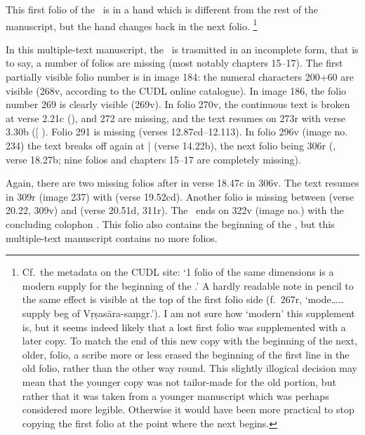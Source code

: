 This first folio of the \VSS\ is in a hand which is different from the
rest of the manuscript, but the hand changes back in the next folio.%
	\footnote{Cf.~the metadata on the CUDL site: 
	`1 folio of the same dimensions is a modern supply for the 
	beginning of the .' A hardly readable 
	note in pencil to the same effect is visible at the
    top of the first folio side (f.~267r, `mode\ldots{}\ldots{} supply beg
    of Vṛṣasāra-saṃgr.'). I am not sure how `modern' this supplement is,
   but it seems indeed likely that a lost first folio was supplemented
   with a later copy. To match the end of this new copy with the
   beginning of the next, older, folio, a scribe more or less erased the
   beginning of the first line in the old folio, rather than the other
   way round. This slightly illogical decision may mean that the younger
   copy was not tailor-made for the old portion, but rather that it was
   taken from a younger manuscript which was perhaps considered more
   legible. Otherwise it would have been more practical to stop copying
   the first folio at the point where the next begins.}

In this multiple-text manuscript, the \VSS\ is trasmitted in an incomplete
form, that is to say, a number of folios are missing (most notably
chapters 15--17). The first partially visible folio number is in image
184: the numeral characters 200+60 are visible (268v, according to the
CUDL online catalogue). In image 186, the folio number 269 is clearly
visible (\fol269v). In folio 270v, the continuous text is broken at verse
2.21c (),  and 272 are missing, and the text
resumes on \fol273r with verse 3.30b ({[}\skt{ahiṃsā
pa}{]} ). Folio 291 is missing (verses
12.87cd--12.113). In folio 296v (image no. 234) the text breaks off
again at  |  (verse 14.22b), the next folio being 306r (,
verse 18.27b; nine folios and chapters 15--17 are completely
missing).

Again, there are two missing folios after  in
verse 18.47c in \fol306v. The text resumes in \fol309r (image 237)
with  (verse 19.52cd). Another folio is missing between  (verse
20.22, \fol309v) and  (verse 20.51d, \fol311r). The \VSS\ ends on \fol322v (image no.) with the
concluding colophon . 
This folio also contains the beginning of the , 
but this multiple-text manuscript contains no more folios.

